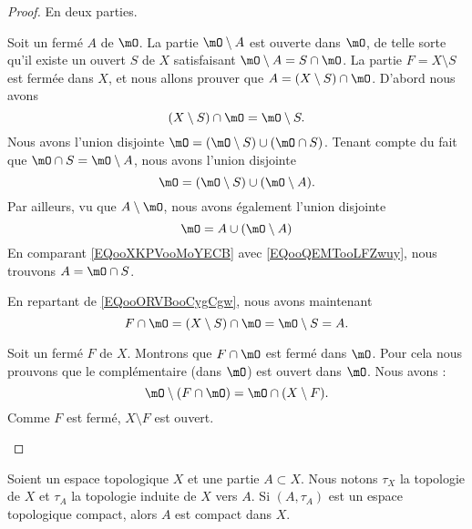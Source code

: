 \begin{proof}
	En deux parties.
	\begin{subproof}
		Soit un fermé \( A\) de \( \mO\). La partie \( \mO\setminus A\) est ouverte dans \( \mO\), de telle sorte qu'il existe un ouvert \( S\) de \( X\) satisfaisant \( \mO\setminus A=S\cap \mO\). La partie \( F=X\setminus S\) est fermée dans \( X\), et nous allons prouver que \( A=(X\setminus S)\cap \mO\). D'abord nous avons
		\begin{equation}		\label{EQooORVBooCygCgw}
			(X\setminus S)\cap\mO=\mO\setminus S.
		\end{equation}
		Nous avons l'union disjointe \( \mO=(\mO\setminus S)\cup (\mO\cap S)\). Tenant compte du fait que \( \mO\cap S=\mO\setminus A\), nous avons l'union disjointe
		\begin{equation}	\label{EQooXKPVooMoYECB}
			\mO=(\mO\setminus S)\cup (\mO\setminus A).
		\end{equation}
		Par ailleurs, vu que \( A\setminus \mO\), nous avons également l'union disjointe
		\begin{equation}	\label{EQooQEMTooLFZwuy}
			\mO=A\cup (\mO\setminus A)
		\end{equation}
		En comparant \eqref{EQooXKPVooMoYECB} avec \eqref{EQooQEMTooLFZwuy}, nous trouvons \( A=\mO\cap S\).

		En repartant de \eqref{EQooORVBooCygCgw}, nous avons maintenant
		\begin{equation}
			F\cap \mO=(X\setminus S)\cap \mO=\mO\setminus S=A.
		\end{equation}

		Soit un fermé \( F\) de \( X\). Montrons que \( F\cap\mO\) est fermé dans \( \mO\). Pour cela nous prouvons que le complémentaire (dans \( \mO\)) est ouvert dans \( \mO\). Nous avons :
		\begin{equation}
			\mO\setminus(F\cap\mO)=\mO\cap(X\setminus F).
		\end{equation}
		Comme \( F\) est fermé, \( X\setminus F\) est ouvert.
	\end{subproof}
\end{proof}

\begin{proposition}	\label{PROPooNZTTooTrKoVF}
	Soient un espace topologique \( X\) et une partie \( A\subset X\). Nous notons \( \tau_X\) la topologie de \( X\) et \( \tau_A\) la topologie induite de \( X\) vers \( A\). Si \( (A,\tau_A)\) est un espace topologique compact, alors \( A\) est compact dans \( X\).
\end{proposition}

